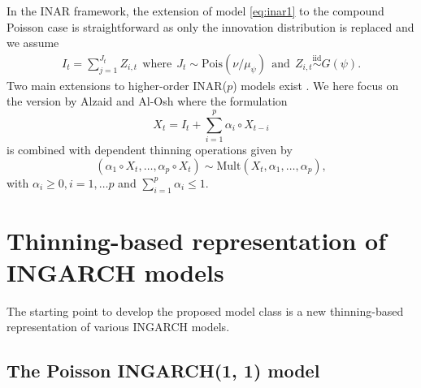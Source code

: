 \documentclass{article}
\begin{document}
In the INAR framework,  the extension of model \eqref{eq:inar1} to the compound Poisson case \cite{Schweer2014} is straightforward as only the innovation distribution is replaced and we assume
\begin{align*}
I_t = \sum_{j = 1}^{J_t} Z_{i, t}  \ \ \text{where} \ \ J_t \sim \text{Pois}(\nu/\mu_\psi) \ \ \text{and} \ \ Z_{i, t} \stackrel{\text{iid}}{\sim} G(\psi). 
\end{align*}
Two main extensions to higher-order INAR($p$) models exist \citep{Alzaid1990, Du1991}. We here focus on the version by Alzaid and Al-Osh \cite{Alzaid1990} where the formulation
$$
X_t = I_t + \sum_{i = 1}^p \alpha_i \circ X_{t - i}
$$
is combined with dependent thinning operations given by
\begin{equation}
(\alpha_1 \circ X_t, \dots, \alpha_p \circ X_t) \sim \text{Mult}(X_t, \alpha_1, \dots, \alpha_p), \label{eq:multinomial_thinning}
\end{equation}
with $\alpha_i \geq 0, i = 1, \dots p$ and $\sum_{i = 1}^p \alpha_i \leq 1$.


 


\section{Thinning-based representation of INGARCH models}%
\label{sec:alternative_formulation}

The starting point to develop the proposed model class is a new thinning-based representation of various INGARCH models.

\subsection{The Poisson INGARCH(1, 1) model}
\label{subsec:poisson11}
\end{document}
